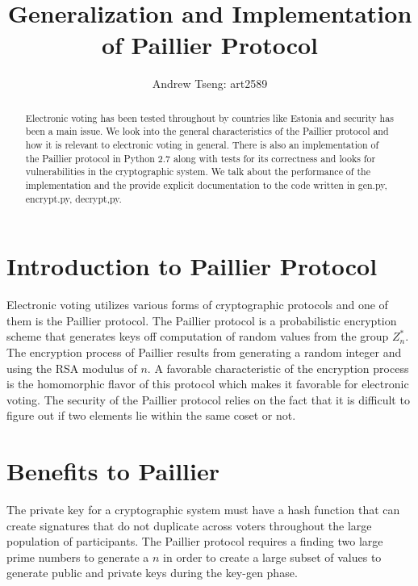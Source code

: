 \documentclass[12pt]{amsart}
\title{Generalization and Implementation of Paillier Protocol}
\author{Andrew Tseng: art2589}
\begin{document}
\maketitle

\begin{abstract}
    Electronic voting has been tested throughout by countries like Estonia and
    security has been a main issue. We look into the general characteristics of
    the Paillier protocol and how it is relevant to electronic voting in general.
    There is also an implementation of the Paillier protocol in Python 2.7 along
    with tests for its correctness and looks for vulnerabilities in the cryptographic
    system. We talk about the performance of the implementation and the provide
    explicit documentation to the code written in gen.py, encrypt.py, decrypt,py.\\
\end{abstract}

\section*{\textbf{Introduction to Paillier Protocol}}

\indent Electronic voting utilizes various forms of cryptographic protocols and
one of them is the Paillier protocol. The Paillier protocol is a probabilistic
encryption scheme that generates keys off computation of random values from the 
group $Z_{n}^{*}$. The encryption process of Paillier results from generating a
random integer and using the RSA modulus of $n$. A favorable characteristic of
the encryption process is the homomorphic flavor of this protocol which makes it
favorable for electronic voting. The security of the Paillier protocol relies
on the fact that it is difficult to figure out if two elements lie within the
same coset or not.

\section*{\textbf{Benefits to Paillier}}

\indent The private key for a cryptographic system must have a hash function that
can create signatures that do not duplicate across voters throughout the large
population of participants. The Paillier protocol requires a finding two large prime
numbers to generate a $n$ in order to create a large subset of values to generate
public and private keys during the key-gen phase. \\
\end{document}
